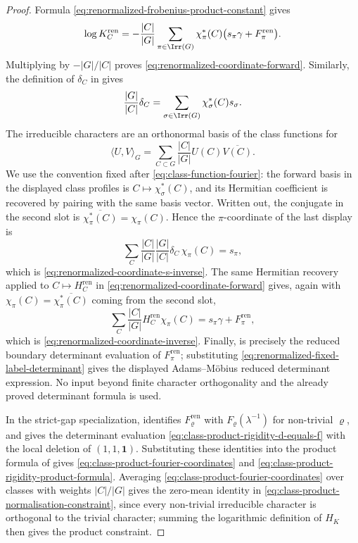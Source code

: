 \begin{proof}
  Formula \eqref{eq:renormalized-frobenius-product-constant} gives
  \[
    \log K_C^{\mathrm{ren}}
    =
    -\frac{|C|}{|G|}
      \sum_{\pi\in\Irr(G)}
        \chi_\pi^\ast(C)
        \bigl(s_\pi\gamma+F_\pi^{\mathrm{ren}}\bigr).
  \]
  Multiplying by \(-|G|/|C|\) proves
  \eqref{eq:renormalized-coordinate-forward}.  Similarly, the definition of
  \(\delta_C\) in
   gives
  \[
    \frac{|G|}{|C|}\delta_C
    =
    \sum_{\sigma\in\Irr(G)}\chi_\sigma^\ast(C)s_\sigma .
  \]
  The irreducible characters are
  an orthonormal basis of the class functions for
  \[
    \langle U,V\rangle_G
    =
    \sum_{C\subset G}\frac{|C|}{|G|}U(C)\overline{V(C)}.
  \]
  We use the convention fixed after \eqref{eq:class-function-fourier}:
  the forward basis in the displayed class profiles is
  \(C\mapsto\chi_\sigma^\ast(C)\), and its Hermitian coefficient is
  recovered by pairing with the same basis vector.  Written out, the
  conjugate in the second slot is
  \(\overline{\chi_\pi^\ast(C)}=\chi_\pi(C)\).  Hence the
  \(\pi\)-coordinate of the last display is
  \[
    \sum_C\frac{|C|}{|G|}
      \frac{|G|}{|C|}\delta_C\,\chi_\pi(C)
    =
    s_\pi,
  \]
  which is \eqref{eq:renormalized-coordinate-s-inverse}.
  The same Hermitian recovery applied to
  \(C\mapsto H_C^{\mathrm{ren}}\) in
  \eqref{eq:renormalized-coordinate-forward} gives, again with
  \(\chi_\pi(C)=\overline{\chi_\pi^\ast(C)}\) coming from the second
  slot,
  \[
    \sum_C\frac{|C|}{|G|}
      H_C^{\mathrm{ren}}\chi_\pi(C)
    =
    s_\pi\gamma+F_\pi^{\mathrm{ren}},
  \]
  which is \eqref{eq:renormalized-coordinate-inverse}.  Finally,
   is precisely the reduced
  boundary determinant evaluation of \(F_\pi^{\mathrm{ren}}\); substituting
  \eqref{eq:renormalized-fixed-label-determinant} gives the displayed
  Adams--M\"obius reduced determinant expression.  No input beyond finite
  character orthogonality and the already proved determinant formula is used.

  In the strict-gap specialization,
   identifies
  \(F_\varrho^{\mathrm{ren}}\) with \(F_\varrho(\lambda^{-1})\) for
  non-trivial \(\varrho\), and
   gives the determinant evaluation
  \eqref{eq:class-product-rigidity-d-equals-f} with the local deletion of
  \((1,1,\mathbf1)\).  Substituting these identities into the product
  formula of  gives
  \eqref{eq:class-product-fourier-coordinates} and
  \eqref{eq:class-product-rigidity-product-formula}.  Averaging
  \eqref{eq:class-product-fourier-coordinates} over classes with weights
  \(|C|/|G|\) gives the zero-mean identity in
  \eqref{eq:class-product-normalisation-constraint}, since every non-trivial
  irreducible character is orthogonal to the trivial character; summing the
  logarithmic definition of \(H_K\) then gives the product constraint.


\end{proof}

